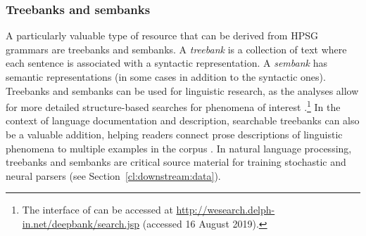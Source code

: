 \documentclass[output=paper,nonflat]{langsci/langscibook}
\begin{document}

\subsubsection{Treebanks and sembanks}
\label{cl:lang-doc:treebanks}


A particularly valuable type of resource that can be derived from HPSG
grammars are treebanks and sembanks. A \textit{treebank} is a collection of
text where each sentence is associated with a syntactic
representation. A \textit{sembank} has semantic representations (in some cases
in addition to the syntactic ones). Treebanks and sembanks can be used
for linguistic research, as the analyses allow for more detailed
structure-based searches for phenomena of interest \citep{Rohde:05,Gho:Bir:10,Kou:Oep:14}.\footnote{The  interface of \citet{Kou:Oep:14} can be accessed at \url{http://wesearch.delph-in.net/deepbank/search.jsp} (accessed 16 August 2019).}
In the context of language documentation and description, searchable
treebanks can also be a valuable addition, helping readers connect
prose descriptions of linguistic phenomena to multiple examples in the
corpus \citep{Ben:Gho:Bal:Dri:12}. In natural language processing,
treebanks and sembanks are critical source material for training
stochastic and neural parsers (see Section~\ref{cl:downstream:data}).
\end{document}
